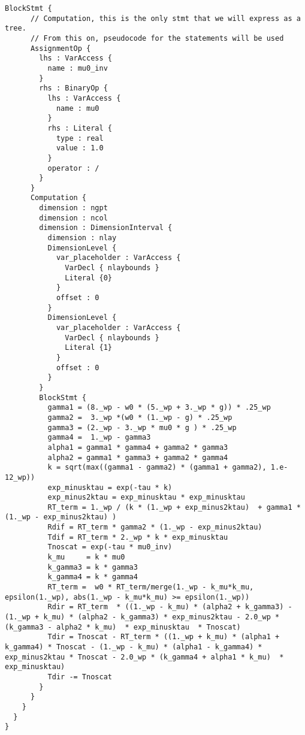 \begin{lstlisting}[style=default]
    BlockStmt {
      // Computation, this is the only stmt that we will express as a tree. 
      // From this on, pseudocode for the statements will be used
      AssignmentOp {
        lhs : VarAccess {
          name : mu0_inv
        }
        rhs : BinaryOp {
          lhs : VarAccess {
            name : mu0
          }
          rhs : Literal {
            type : real
            value : 1.0
          }
          operator : /
        }
      }
      Computation {
        dimension : ngpt
        dimension : ncol
        dimension : DimensionInterval {
          dimension : nlay
          DimensionLevel {
            var_placeholder : VarAccess { 
              VarDecl { nlaybounds }
              Literal {0}
            }
            offset : 0
          }
          DimensionLevel {
            var_placeholder : VarAccess { 
              VarDecl { nlaybounds }
              Literal {1}
            }
            offset : 0
          }
        }
        BlockStmt {
          gamma1 = (8._wp - w0 * (5._wp + 3._wp * g)) * .25_wp
          gamma2 =  3._wp *(w0 * (1._wp - g) * .25_wp
          gamma3 = (2._wp - 3._wp * mu0 * g ) * .25_wp
          gamma4 =  1._wp - gamma3
          alpha1 = gamma1 * gamma4 + gamma2 * gamma3 
          alpha2 = gamma1 * gamma3 + gamma2 * gamma4 
          k = sqrt(max((gamma1 - gamma2) * (gamma1 + gamma2), 1.e-12_wp))
          exp_minusktau = exp(-tau * k)
          exp_minus2ktau = exp_minusktau * exp_minusktau
          RT_term = 1._wp / (k * (1._wp + exp_minus2ktau)  + gamma1 * (1._wp - exp_minus2ktau) )
          Rdif = RT_term * gamma2 * (1._wp - exp_minus2ktau)
          Tdif = RT_term * 2._wp * k * exp_minusktau
          Tnoscat = exp(-tau * mu0_inv)
          k_mu     = k * mu0
          k_gamma3 = k * gamma3
          k_gamma4 = k * gamma4
          RT_term =  w0 * RT_term/merge(1._wp - k_mu*k_mu, epsilon(1._wp), abs(1._wp - k_mu*k_mu) >= epsilon(1._wp))
          Rdir = RT_term  * ((1._wp - k_mu) * (alpha2 + k_gamma3) -  (1._wp + k_mu) * (alpha2 - k_gamma3) * exp_minus2ktau - 2.0_wp * (k_gamma3 - alpha2 * k_mu)  * exp_minusktau  * Tnoscat)
          Tdir = Tnoscat - RT_term * ((1._wp + k_mu) * (alpha1 + k_gamma4) * Tnoscat - (1._wp - k_mu) * (alpha1 - k_gamma4) * exp_minus2ktau * Tnoscat - 2.0_wp * (k_gamma4 + alpha1 * k_mu)  * exp_minusktau)
          Tdir -= Tnoscat
        }   
      }
    }
  }
}
\end{lstlisting}
